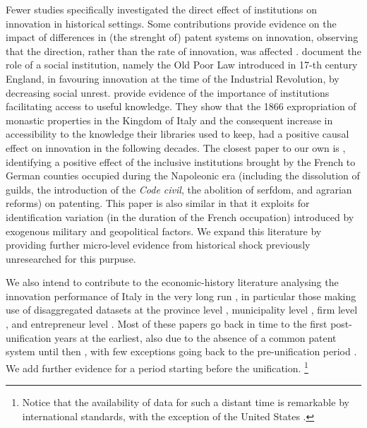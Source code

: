 Fewer studies specifically investigated the direct effect of institutions on innovation in historical settings. 
Some contributions provide evidence on the impact of differences in (the strenght of) patent systems on innovation, observing that the direction, rather than the rate of innovation, was affected \citep{moser2005, moser2012, lerner2009}.
\citet{greif2012} document the role of a social institution, namely the Old Poor Law introduced in 17-th century England, in favouring innovation at the time of the Industrial Revolution, by decreasing social unrest.
\cite{buonanno2024} provide evidence of the importance of institutions facilitating access to useful knowledge. They show that the 1866 expropriation of monastic properties in the Kingdom of Italy and the consequent increase in accessibility to the knowledge their libraries used to keep, had a positive causal effect on innovation in the following decades. 
The closest paper to our own is \citet{donges2022}, identifying a positive effect of the inclusive institutions brought by the French to German counties occupied during the Napoleonic era (including the dissolution of guilds, the introduction of the \textit{Code civil}, the abolition of serfdom, and agrarian reforms) on patenting. This paper is also similar in that it exploits for identification variation (in the duration of the French occupation) introduced by exogenous military and geopolitical factors.
We expand this literature by providing further micro-level evidence from historical shock previously unresearched for this purpuse. 

We also intend to contribute to the economic-history literature analysing the innovation performance of Italy in the very long run \citep{barbielliniamidei2013, nuvolari2015b}, in particular those making use of disaggregated datasets at the province level \citep{nuvolari2018}, municipality level \citep{buonanno2024}, firm level \citep{domini2023}, and entrepreneur level \citep{toninelli2014, nuvolari2018}. 
Most of these papers go back in time to the first post-unification years at the earliest, also due to the absence of a common patent system until then \citep{nuvolari2019}, with few exceptions going back to the pre-unification period \citep{nuvolari2020}. 
We add further evidence for a period starting before the unification. \footnote{Notice that the availability of data for such a distant time is remarkable by international standards, with the exception of the United States \citep{bergeaud24, petralia16}.}

